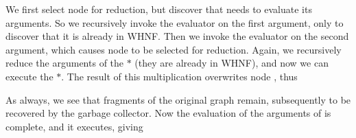 \noindent We first select node \ml{\$} for reduction, but discover that \ml{+} needs to evaluate its
arguments. So we recursively invoke the evaluator on the first argument, only
to discover that it is already in WHNF. Then we invoke the evaluator on the
second argument, which causes node \ml{\#} to be selected for reduction. Again,
we recursively reduce the arguments of the $*$ (they are already in WHNF),
and now we can execute the $*$. The result of this multiplication overwrites
node \ml{\#}, thus


\noindent As always, we see that fragments of the original graph remain, subsequently
to be recovered by the garbage collector. Now the evaluation of the
arguments of \ml{+} is complete, and it executes, giving


